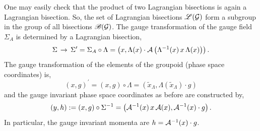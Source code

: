 \documentclass[12pt,a4paper]{article}
\numberwithin{equation}{section}
\theoremstyle{definition}
\begin{document}
One may easily check that the product of two Lagrangian bisections is again a Lagrangian bisection. So, the set of Lagrangian bisections $\mathscr{L}(\cal{G})$ form a subgroup in the group of all bisections $\mathscr{B}(\cal{G})$. The gauge transformation of the gauge field $\Sigma_A$ is determined by a Lagrangian bisection,
\begin{equation}\label{gtR}
\Sigma\,\to\,\Sigma^\prime=\Sigma_A\circ \Lambda=\left(x, \Lambda(x)\cdot{\cal A}\left(\Lambda^{-1}(x)\,x\,\Lambda(x)\right)\right).
\end{equation}
The gauge transformation of the elements of the groupoid (phase space coordinates) is,
\begin{equation}
(x,g)^\prime=(x,g)\circ \Lambda=\left(\tilde x_\Lambda, \Lambda(\tilde x_\Lambda)\cdot g\right)
\end{equation}
and the gauge invariant phase space coordinates as before are constructed by,
\begin{equation}\label{gicml}
(y,h) :=(x,g)\circ \Sigma^{-1}=\left({\cal A}^{-1}(x)\,x\,{\cal A}(x), {\cal A}^{-1}(x)\cdot g\right).
\end{equation}
In particular, the gauge invariant momenta are $h={\cal A}^{-1}(x)\cdot g$.
\end{document}
